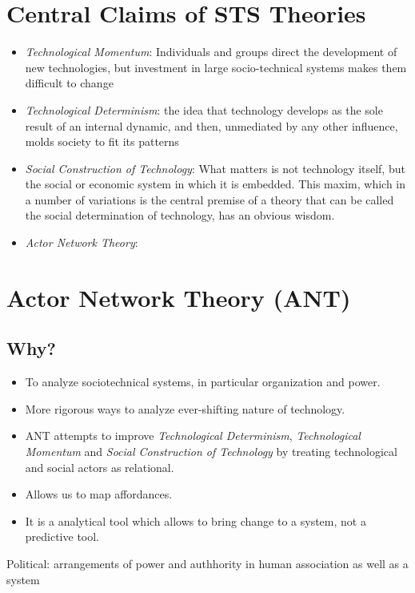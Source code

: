 \documentclass[a4paper]{article}
\numberwithin{equation}{section}
\begin{document}
\section{Central Claims of STS Theories}
\begin{itemize}
    \item \textit{Technological Momentum}: Individuals and groups direct the development of new technologies, but investment in large socio-technical systems makes them difficult to change
    \item \textit{Technological Determinism}: the idea that technology develops as the sole result of an internal dynamic, and then, unmediated by any other influence, molds society to fit its patterns
    \item \textit{Social Construction of Technology}: What matters is not technology itself, but the social or economic system in which it is embedded. This maxim, which in a number of variations is the central premise of a theory that can be called the social determination of technology, has an obvious wisdom.
    \item \textit{Actor Network Theory}: 
\end{itemize}
\section{Actor Network Theory (ANT)}
\subsection{Why?}
\begin{itemize}
    \item To analyze sociotechnical systems, in particular organization and power.
    \item More rigorous ways to analyze ever-shifting nature of technology.
    \item ANT attempts to improve \textit{Technological Determinism}, \textit{Technological Momentum} and \textit{Social Construction of Technology} by treating technological and social actors as relational.
    \item Allows us to map affordances.
    \item It is a analytical tool which allows to bring change to a system, not a predictive tool.
\end{itemize}

Political: arrangements of power and authhority in human association as well as a system
\end{document}
